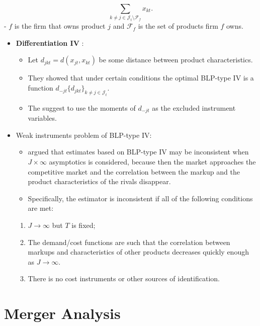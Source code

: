 \documentclass[
]{book}
\providecommand{\tightlist}{%
  \setlength{\itemsep}{0pt}\setlength{\parskip}{0pt}}
\begin{document}
\begin{equation}
\sum_{k \neq j \in \mathcal{J}_t \setminus \mathcal{F}_{f}} x_{kt}.
\end{equation}
- \(f\) is the firm that owns product \(j\) and \(\mathcal{F}_{f}\) is the set of products firm \(f\) owns.

\begin{itemize}
\tightlist
\item
  \textbf{Differentiation IV} \citep{Gandhi2015a}:

  \begin{itemize}
  \tightlist
  \item
    Let \(d_{jkt} = d(x_{jt}, x_{kt})\) be some distance between product characteristics.
  \item
    They showed that under certain conditions the optimal BLP-type IV is a function \(d_{-jt}\{d_{jkt}\}_{k \neq j \in \mathcal{J}_t}\).
  \item
    The suggest to use the moments of \(d_{-jt}\) as the excluded instrument variables.
  \end{itemize}
\item
  Weak instruments problem of BLP-type IV:

  \begin{itemize}
  \tightlist
  \item
    \citet{Armstrong2016b} argued that estimates based on BLP-type IV may be inconsistent when \(J \times \infty\) asymptotics is considered, because then the market approaches the competitive market and the correlation between the markup and the product characteristics of the rivals disappear.
  \item
    Specifically, the estimator is inconsistent if all of the following conditions are met:
  \end{itemize}

  \begin{enumerate}
  \def\labelenumi{\arabic{enumi}.}
  \tightlist
  \item
    \(J \to \infty\) but \(T\) is fixed;
  \item
    The demand/cost functions are such that the correlation between markups and characteristics of other products decreases quickly enough as \(J \to \infty\).
  \item
    There is no cost instruments or other sources of identification.
  \end{enumerate}
\end{itemize}

\hypertarget{merger}{%
\chapter{Merger Analysis}\label{merger}}
\end{document}
